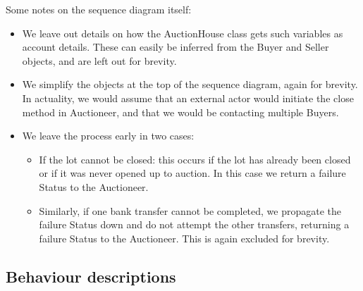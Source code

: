\documentclass[titlepage, 12pt]{extarticle}
\begin{document}
\noindent Some notes on the sequence diagram itself:
\begin{itemize}
  \item We leave out details on how the AuctionHouse class gets such variables as account details. These can easily be inferred from the Buyer and Seller objects, and are left out for brevity. 
  \item We simplify the objects at the top of the sequence diagram, again for brevity. In actuality, we would assume that an external actor would initiate the close method in Auctioneer, and that we would be contacting multiple Buyers.
  \item We leave the process early in two cases:
    \begin{itemize}
      \item If the lot cannot be closed: this occurs if the lot has already been closed or if it was never opened up to auction. In this case we return a failure Status to the Auctioneer.
      \item Similarly, if one bank transfer cannot be completed, we propagate the failure Status down and do not attempt the other transfers, returning a failure Status to the Auctioneer. This is again excluded for brevity.
    \end{itemize}
\end{itemize}

\subsection{Behaviour descriptions}
\end{document}
